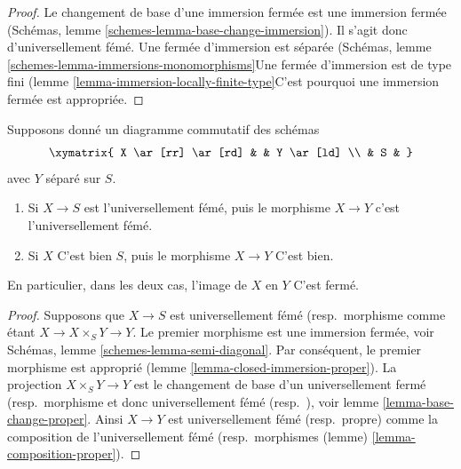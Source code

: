 \begin{proof}

Le changement de base d'une immersion fermée est une immersion fermée (Schémas, lemme \ref{schemes-lemma-base-change-immersion}). Il s'agit donc d'universellement fémé. Une fermée d'immersion est séparée (Schémas, lemme \ref{schemes-lemma-immersions-monomorphisms}Une fermée d'immersion est de type fini (lemme \ref{lemma-immersion-locally-finite-type}C'est pourquoi une immersion fermée est appropriée.

\end{proof}

\begin{lemma}

\label{lemma-image-proper-scheme-closed}

Supposons donné un diagramme commutatif des schémas
$$
\xymatrix{
X \ar[rr] \ar[rd] & &
Y \ar[ld] \\
& S &
}
$$
avec $Y$ séparé sur $S$.

\begin{enumerate}

\item Si $X \to S$ est l'universellement fémé, puis le morphisme
$X \to Y$ c'est l'universellement fémé.
\item Si $X$ C'est bien $S$, puis le morphisme $X \to Y$ C'est bien.

\end{enumerate}

En particulier, dans les deux cas, l'image de $X$ en $Y$ C'est fermé.

\end{lemma}

\begin{proof}

Supposons que $X \to S$ est universellement fémé (resp.\ morphisme comme étant $X \to X \times_S Y \to Y$. Le premier morphisme est une immersion fermée, voir Schémas, lemme \ref{schemes-lemma-semi-diagonal}. Par conséquent, le premier morphisme est approprié (lemme \ref{lemma-closed-immersion-proper}). La projection $X \times_S Y \to Y$ est le changement de base d'un universellement fermé (resp.\ morphisme et donc universellement fémé (resp.\ ), voir lemme \ref{lemma-base-change-proper}. Ainsi $X \to Y$ est universellement fémé (resp.\ propre) comme la composition de l'universellement fémé (resp.\ morphismes (lemme) \ref{lemma-composition-proper}).

\end{proof}

